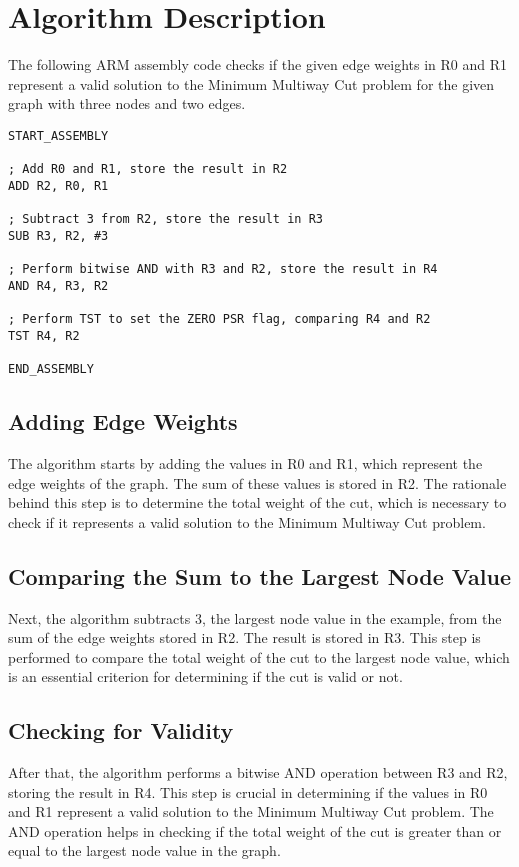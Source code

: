 \section{Algorithm Description}

The following ARM assembly code checks if the given edge weights in R0 and R1 represent a valid solution to the Minimum Multiway Cut problem for the given graph with three nodes and two edges.

\begin{verbatim}
START_ASSEMBLY

; Add R0 and R1, store the result in R2
ADD R2, R0, R1

; Subtract 3 from R2, store the result in R3
SUB R3, R2, #3

; Perform bitwise AND with R3 and R2, store the result in R4
AND R4, R3, R2

; Perform TST to set the ZERO PSR flag, comparing R4 and R2
TST R4, R2

END_ASSEMBLY
\end{verbatim}

\subsection{Adding Edge Weights}

The algorithm starts by adding the values in R0 and R1, which represent the edge weights of the graph. The sum of these values is stored in R2. The rationale behind this step is to determine the total weight of the cut, which is necessary to check if it represents a valid solution to the Minimum Multiway Cut problem.

\subsection{Comparing the Sum to the Largest Node Value}

Next, the algorithm subtracts 3, the largest node value in the example, from the sum of the edge weights stored in R2. The result is stored in R3. This step is performed to compare the total weight of the cut to the largest node value, which is an essential criterion for determining if the cut is valid or not.

\subsection{Checking for Validity}

After that, the algorithm performs a bitwise AND operation between R3 and R2, storing the result in R4. This step is crucial in determining if the values in R0 and R1 represent a valid solution to the Minimum Multiway Cut problem. The AND operation helps in checking if the total weight of the cut is greater than or equal to the largest node value in the graph.

